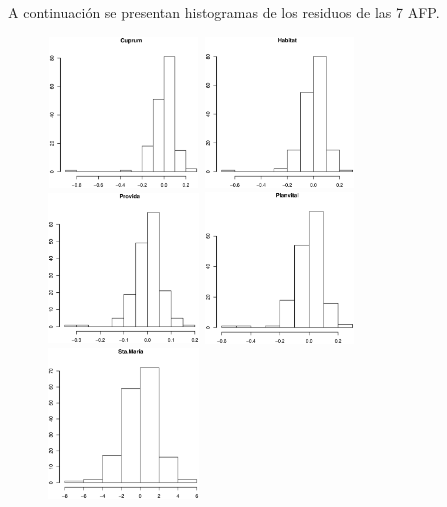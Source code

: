 A continuaci\'on se presentan histogramas de los residuos de las 7 AFP.

\begin{figure}[!htp]
\begin{center}
\centering
  \includegraphics[height=4cm, width=4cm]{grafico1.eps}
  \includegraphics[height=4cm, width=4cm]{grafico2.eps}
  \includegraphics[height=4cm, width=4cm]{grafico3.eps}
  \includegraphics[height=4cm, width=4cm]{grafico4.eps}
  \includegraphics[height=4cm, width=4cm]{grafico5.eps}

\end{center}
\end{figure}
